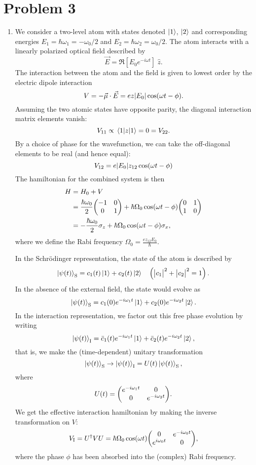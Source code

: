 \documentclass[12pt]{article}
\newcommand{\magsq}[1]{\big|#1\big|^2}
\newcommand{\e}{\mathbf{e}}
\begin{document}
\section*{Problem 3}
\begin{enumerate}[label=(\alph*)]
    \item We consider a two-level atom with states denoted $\ket{1}$, $\ket{2}$ and corresponding energies $E_1 = \hbar\omega_1 = -\omega_0/2$ and $E_2 = \hbar\omega_2 = \omega_0/2$. The atom interacts with a linearly polarized optical field described by
    \[ \vec{E} = \Re[E_0e^{-i\omega t}]\;\hat{z}. \]
    The interaction between the atom and the field is given to lowest order by the electric dipole interaction
    \[ V = -\vec{\mu}\cdot\vec{E} = e z \abs{E_0}\cos(\omega t - \phi). \]
    Assuming the two atomic states have opposite parity, the diagonal interaction matrix elements vanish:
    \[ V_{11} \propto \mel{1}{z}{1} = 0 = V_{22}. \]
    By a choice of phase for the wavefunction, we can take the off-diagonal elements to be real (and hence equal):
    \[ V_{12} = e\abs{E_0}z_{12}\cos(\omega t - \phi) \]
    The hamiltonian for the combined system is then
    \begin{align*}
        H &= H_0 + V \\
        &= \frac{\hbar \omega_0}{2}\mqty(-1&0\\0&1) + \hbar\Omega_0\cos(\omega t - \phi)\mqty(0&1\\1&0) \\
        &= -\frac{\hbar\omega_0}{2}\sigma_z + \hbar\Omega_0\cos(\omega t - \phi)\sigma_x,
    \end{align*}
    where we define the Rabi frequency $\Omega_0 = \frac{ez_{12}E_0}{\hbar}$.

    In the Schr{\"o}dinger representation, the state of the atom is described by
    \[ \ket{\psi(t)}_\text{S} = c_1(t)\ket{1} + c_2(t)\ket{2} \quad \left(\magsq{c_1} + \magsq{c_2} = 1\right). \]
    In the absence of the external field, the state would evolve as
    \[ \ket{\psi(t)}_\text{S} = c_1(0)e^{-i\omega_1t}\ket{1} + c_2(0)e^{-i\omega_2t}\ket{2}. \]
    In the interaction representation, we factor out this free phase evolution by writing
    \[ \ket{\psi(t)}_\text{I} = \bar{c}_1(t)e^{-i\omega_1t}\ket{1} + \bar{c}_2(t)e^{-i\omega_2t}\ket{2}, \]
    that is, we make the (time-dependent) unitary transformation
    \[ \ket{\psi(t)}_\text{S} \to \ket{\psi(t)}_\text{I} = U(t)\ket{\psi(t)}_\text{S}, \]
    where
    \[ U(t) = \mqty(e^{-i\omega_1t}&0\\0&e^{-i\omega_2t}). \] 
    We get the effective interaction hamiltonian by making the inverse transformation on $V$:
    \[ V_\text{I} = U^\dag VU = \hbar\Omega_0 \cos(\omega t) \mqty(0&e^{-i\omega_0t}\\e^{i\omega_0t}&0), \]
    where the phase $\phi$ has been absorbed into the (complex) Rabi frequency.


\end{enumerate}
\end{document}
